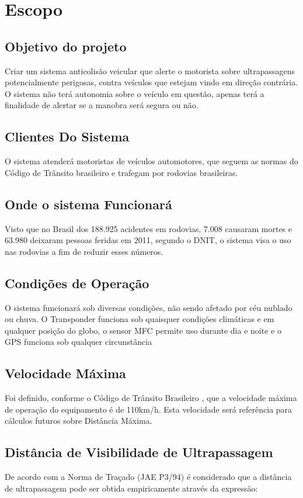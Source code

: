 \chapter[Escopo]{Escopo}

\section{Objetivo do projeto}
Criar um sistema anticolisão veicular que alerte o motorista sobre ultrapassagens potencialmente perigosas, contra veículos que estejam vindo em direção contrária.
O sistema não terá autonomia sobre o veículo em questão, apenas terá a finalidade de alertar se a manobra será segura ou não.

\section{Clientes Do Sistema}
O sistema atenderá motoristas de veículos automotores, que seguem as normas do Código de Trânsito brasileiro e trafegam por rodovias brasileiras.

\section{Onde o sistema Funcionará}
Visto que no Brasil dos 188.925 acidentes em rodovias, 7.008 causaram mortes e 63.980 deixaram pessoas feridas em 2011, segundo o DNIT, o sistema visa o uso nas rodovias a fim de reduzir esses números. \cite{ministerio}

\section{Condições de Operação}
O sistema funcionará sob diversas condições, não sendo afetado por céu nublado ou chuva.
O Transponder funciona sob quaisquer condições climáticas e em qualquer posição do  globo, o sensor MFC \cite{mfc} permite uso durante dia e noite e o GPS funciona sob qualquer circunstância

\section{Velocidade Máxima}
Foi definido, conforme o Código de Trânsito Brasileiro \cite{ctb}, que a velocidade máxima de operação do equipamento é de 110km/h.
Esta velocidade será referência para cálculos futuros sobre Distância Máxima.

\section{Distância de Visibilidade de Ultrapassagem}
De acordo com a Norma de Traçado (JAE P3/94) é considerado que a distância  de ultrapassagem pode ser obtida empiricamente através da expressão:

